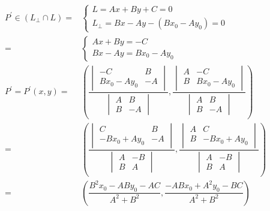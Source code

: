 \documentclass[
]{book}
\theoremstyle{definition}
\theoremstyle{definition}
\theoremstyle{definition}
\theoremstyle{definition}
\theoremstyle{remark}
\begin{document}
\[
\begin{aligned}
P^{\prime}\in\left(L_{\perp}\cap L\right)= & \begin{cases}
L=Ax+By+C=0\\
L_{\perp}=Bx-Ay-\left(Bx_{0}-Ay_{0}\right)=0
\end{cases}\\
= & \begin{cases}
Ax+By=-C\\
Bx-Ay=Bx_{0}-Ay_{0}
\end{cases}\\
P^{\prime}=P^{\prime}\left(x,y\right)= & \left(\dfrac{\begin{vmatrix}-C & B\\
Bx_{0}-Ay_{0} & -A
\end{vmatrix}}{\begin{vmatrix}A & B\\
B & -A
\end{vmatrix}},\dfrac{\begin{vmatrix}A & -C\\
B & Bx_{0}-Ay_{0}
\end{vmatrix}}{\begin{vmatrix}A & B\\
B & -A
\end{vmatrix}}\right)\\
= & \left(\dfrac{\begin{vmatrix}C & B\\
-Bx_{0}+Ay_{0} & -A
\end{vmatrix}}{\begin{vmatrix}A & -B\\
B & A
\end{vmatrix}},\dfrac{\begin{vmatrix}A & C\\
B & -Bx_{0}+Ay_{0}
\end{vmatrix}}{\begin{vmatrix}A & -B\\
B & A
\end{vmatrix}}\right)\\
= & \left(\dfrac{B^{2}x_{0}-ABy_{0}-AC}{A^{2}+B^{2}},\dfrac{-ABx_{0}+A^{2}y_{0}-BC}{A^{2}+B^{2}}\right)
\end{aligned}
\]
\end{document}
